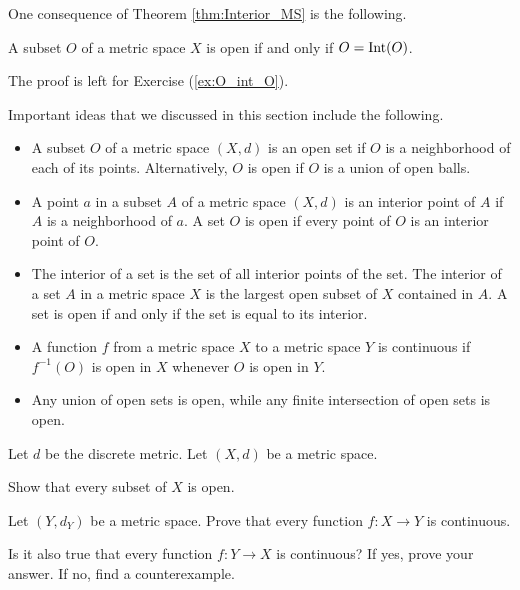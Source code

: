 One consequence of Theorem \ref{thm:Interior_MS} is the following.

\begin{corollary} A subset $O$ of a metric space $X$ is open if and only if $O = \text{Int}(O)$. 
\end{corollary}
 
The proof is left for Exercise (\ref{ex:O_int_O}).

\label{sec_open_sets_summ}
Important ideas that we discussed in this section include the following.
\begin{itemize}
\item A subset $O$ of a metric space $(X,d)$ is an open set if $O$ is a neighborhood of each of its points. Alternatively, $O$ is open if $O$ is a union of open balls.
\item A point $a$ in a subset $A$ of a metric space $(X,d)$ is an interior point of $A$ if $A$ is a neighborhood of $a$. A set $O$ is open if every point of $O$ is an interior point of $O$. 
\item The interior of a set is the set of all interior points of the set. The interior of a set $A$ in a metric space $X$ is the largest open subset of $X$ contained in $A$. A set is open if and only if the set is equal to its interior. 
\item A function $f$ from a metric space $X$ to a metric space $Y$ is continuous if $f^{-1}(O)$ is open in $X$ whenever $O$ is open in $Y$. 
\item Any union of open sets is open, while any finite intersection of open sets is open.
\end{itemize}

\label{sec_open_sets_exer}

\be

\item Let $d$ be the discrete metric. Let $(X,d)$ be a metric space. 
	\ba
	
	\item Show that every subset of $X$ is open.
		
	\item Let $(Y, d_Y)$ be a metric space. Prove that every function $f: X \to Y$ is continuous. 
	
	\item Is it also true that every function $f: Y \to X$ is continuous? If yes, prove your answer. If no, find a counterexample. 

	\ea
	

